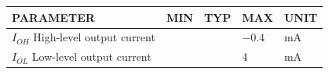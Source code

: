 {\setlength{\tabcolsep}{9pt}\begin{tabular}{lllll}\toprule
PARAMETER & MIN & TYP & MAX & UNIT\\\midrule
$I_{OH}$ High-level output current & & & $-0.4$ & mA\\
$I_{OL}$ Low-level output current & & & 4 & mA\\\bottomrule
\end{tabular}}
